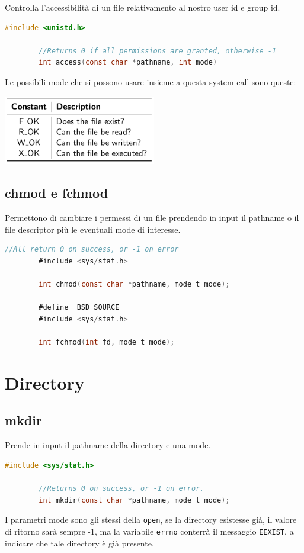 \documentclass[a4paper, 12pt]{book}
\begin{document}
    Controlla l'accessibilità di un file relativamento 
    al nostro user id e group id.
    \begin{lstlisting}[language=C]
        #include <unistd.h>

        //Returns 0 if all permissions are granted, otherwise -1
        int access(const char *pathname, int mode)
    \end{lstlisting}
    Le possibili mode che si possono usare insieme 
    a questa system call sono queste:
    \begin{center}
        \includegraphics[width=0.5\textwidth]{access.png}
    \end{center}

    \subsection{chmod e fchmod}

    Permettono di cambiare i permessi di un file prendendo
    in input il pathname o il file descriptor più le eventuali
    mode di interesse.
    \begin{lstlisting}[language=C]
        //All return 0 on success, or -1 on error
        #include <sys/stat.h>

        int chmod(const char *pathname, mode_t mode);

        #define _BSD_SOURCE
        #include <sys/stat.h>

        int fchmod(int fd, mode_t mode);
    \end{lstlisting}

    \section{Directory}

    \subsection{mkdir}

    Prende in input il pathname della directory e 
    una mode.
    \begin{lstlisting}[language=C]
        #include <sys/stat.h>

        //Returns 0 on success, or -1 on error.
        int mkdir(const char *pathname, mode_t mode);
    \end{lstlisting}
    I parametri mode sono gli stessi della \verb|open|,
    se la directory esistesse già, il valore di ritorno sarà 
    sempre -1, ma la variabile \verb|errno| conterrà 
    il messaggio \verb|EEXIST|, a indicare che tale 
    directory è già presente.
\end{document}
